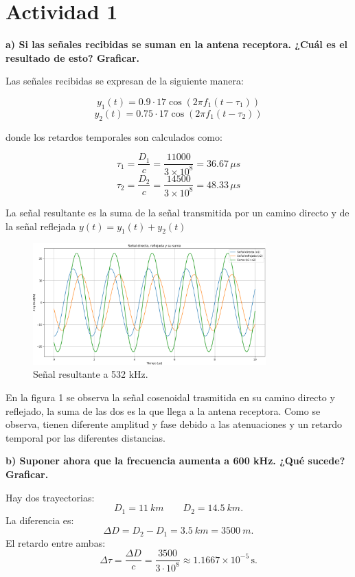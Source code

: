 \section{Actividad 1}

\noindent \textbf{a) Si las señales recibidas se suman en la antena receptora. ¿Cuál es el resultado de 
esto? Graficar. }
\bigskip

Las señales recibidas se expresan de la siguiente manera:

\[
y_1(t) = 0.9 \cdot 17 \cos(2\pi f_1 (t - \tau_1))
\]
\[
y_2(t) = 0.75 \cdot 17 \cos(2\pi f_1 (t - \tau_2))
\]

donde los retardos temporales son calculados como:

\[
\tau_1 = \frac{D_1}{c} = \frac{11000}{3 \times 10^8} = 36.67 \, \mu s
\]
\[
\tau_2 = \frac{D_2}{c} = \frac{14500}{3 \times 10^8} = 48.33 \, \mu s
\]

La señal resultante es la suma de la señal transmitida por un camino directo y de la señal reflejada \(y(t) = y_1(t) + y_2(t)\) 
\bigskip


\begin{figure}[H]
\centering
\includegraphics[width=0.8\textwidth]{parte_teorica/grafico_532kHz.png}
\caption{Señal resultante a 532 kHz.}
\end{figure}
\bigskip

En la figura 1 se observa la señal cosenoidal trasmitida en su camino directo y reflejado, la suma de las dos es la que llega a la antena receptora. Como se observa, tienen diferente amplitud y fase debido a las atenuaciones y un retardo temporal por las diferentes distancias.
\bigskip

\noindent \textbf{b) Suponer ahora que la frecuencia aumenta a 600 kHz. ¿Qué sucede? Graficar. }
\bigskip

Hay dos trayectorias:
\[
D_1 = \SI{11}{km} \qquad D_2 = \SI{14.5}{km}.
\]
\bigskip
La diferencia es:
\[
\Delta D = D_2 - D_1 = \SI{3.5}{km} = \SI{3500}{m}.
\]
\bigskip
El retardo entre ambas:
\[
\Delta \tau = \frac{\Delta D}{c} = 
\frac{3500}{3 \cdot 10^{8}}
\approx 1.1667 \times 10^{-5}\,\text{s}.
\]

